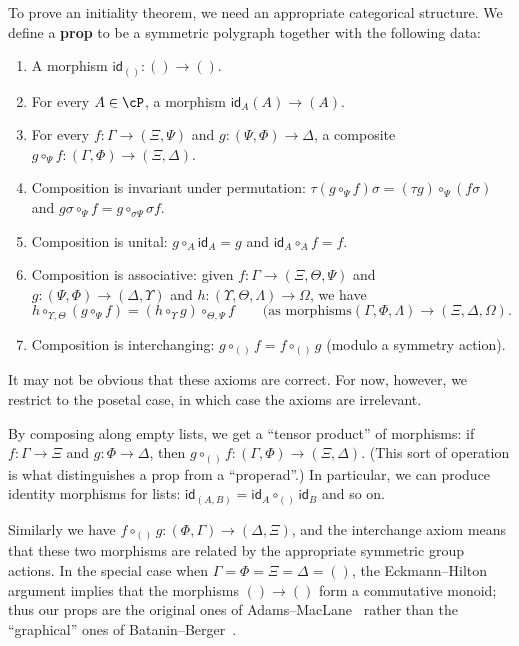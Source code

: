 \documentclass{book}
\def\idfunc{\mathsf{id}}
\begin{document}
To prove an initiality theorem, we need an appropriate categorical structure.
We define a \textbf{prop} to be a symmetric polygraph \cP together with the following data:
\begin{enumerate}
\item A morphism $\idfunc_{()}:()\to ()$.
\item For every $A\in\cP$, a morphism $\idfunc_A (A)\to (A)$.
\item For every $f:\Gamma\to (\Xi,\Psi)$ and $g:(\Psi,\Phi)\to \Delta$, a composite $g\circ_\Psi f : (\Gamma,\Phi) \to (\Xi,\Delta)$.
\item Composition is invariant under permutation: $\tau(g\circ_\Psi f)\sigma = (\tau g)\circ_\Psi (f\sigma)$ and $g\sigma \circ_\Psi f = g\circ_{\sigma \Psi} \sigma f$.
\item Composition is unital:
  $g\circ_A \idfunc_A = g$ and $\idfunc_A\circ_A f = f$.
\item Composition is associative: given $f:\Gamma\to (\Xi,\Theta,\Psi)$ and $g:(\Psi,\Phi)\to (\Delta,\Upsilon)$ and $h:(\Upsilon,\Theta,\Lambda)\to \Omega$, we have
  \[h \circ_{\Upsilon,\Theta} (g\circ_\Psi f) = (h\circ_\Upsilon g) \circ_{\Theta,\Psi} f \qquad \text{(as morphisms} (\Gamma,\Phi,\Lambda) \to (\Xi,\Delta,\Omega). \]
\item Composition is interchanging: $g\circ_{()}f = f\circ_{()}g$ (modulo a symmetry action).
\end{enumerate}
It may not be obvious that these axioms are correct.
For now, however, we restrict to the posetal case, in which case the axioms are irrelevant.

By composing along empty lists, we get a ``tensor product'' of morphisms: if $f:\Gamma\to\Xi$ and $g:\Phi\to\Delta$, then $g\circ_{()}f : (\Gamma,\Phi) \to (\Xi,\Delta)$.
(This sort of operation is what distinguishes a prop from a ``properad''.)
In particular, we can produce identity morphisms for lists: $\idfunc_{(A,B)} = \idfunc_A \circ_{()} \idfunc_B$ and so on.

Similarly we have $f\circ_{()}g : (\Phi,\Gamma) \to (\Delta,\Xi)$, and the interchange axiom means that these two morphisms are related by the appropriate symmetric group actions.
In the special case when $\Gamma=\Phi=\Xi=\Delta=()$, the Eckmann--Hilton argument implies that the morphisms $()\to ()$ form a commutative monoid; thus our props are the original ones of Adams--MacLane~\cite{maclane:natural-assoc,maclane:cat-alg} rather than the ``graphical'' ones of Batanin--Berger~\cite{bb:htapm}.
\end{document}
